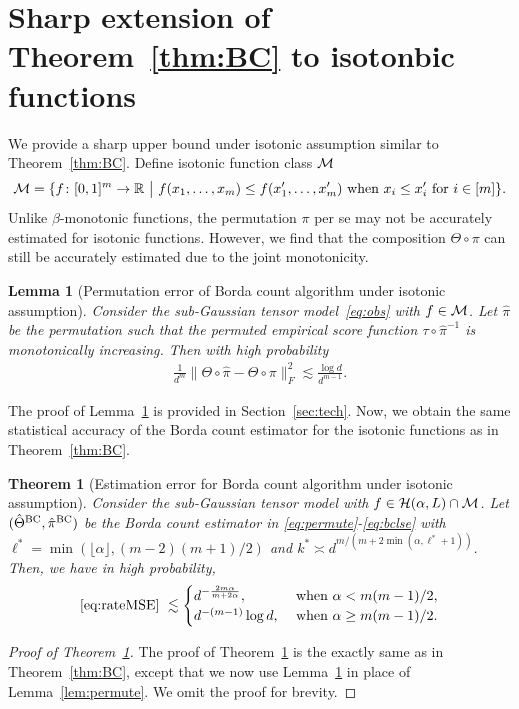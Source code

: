 \documentclass[12pt]{article}
\newtheorem{thm}{Theorem}
\newtheorem{lem}{Lemma}
\theoremstyle{definition}
\begin{document}
 {\color{blue}
\section{Sharp extension of Theorem~\ref{thm:BC} to isotonbic functions}\label{sec:isotonic}
We provide a sharp upper bound under isotonic assumption similar to Theorem~\ref{thm:BC}. Define isotonic function class $\mathcal{M}$ 
\begin{align}
    \tM = \{f\colon[0,1]^m\rightarrow\mathbb{R}\ \big| \ f(x_1,\ldots,x_m)\leq f(x_1',\ldots,x_m')\text{ when } x_i\leq x_i' \text{ for } i\in[m]\}.
\end{align}
Unlike $\beta$-monotonic functions, the permutation $\pi$ per se may not be accurately estimated for isotonic functions. However, we find that the composition $\Theta\circ \pi$ can still be accurately estimated due to the joint monotonicity. 
\begin{lem}[Permutation error of Borda count algorithm under isotonic assumption]\label{lem:isotonic}
Consider the sub-Gaussian tensor model~\eqref{eq:obs} with $f\in\mathcal{M}$. Let $\hat\pi$ be the permutation such that the permuted empirical score function $\tau\circ\hat\pi^{-1}$ is monotonically increasing. Then with high probability
\begin{align}
    \frac{1}{d^m}\|\Theta\circ\hat\pi-\Theta\circ\pi\|_F^2\lesssim \frac{\log d}{d^{m-1}}.
\end{align}
\end{lem}
The proof of Lemma~\ref{lem:isotonic} is provided in Section~\ref{sec:tech}. 
Now, we obtain the same statistical accuracy of the Borda count estimator for the isotonic functions as in Theorem~\ref{thm:BC}. 
\begin{thm}[Estimation error for Borda count algorithm under isotonic assumption]\label{thm:BC2} Consider the sub-Gaussian tensor model with $f\in \mathcal{H}(\alpha,L)\cap \mathcal{M}$.
Let $(\hat\Theta^{\textup{BC}},\hat\pi^{\textup{BC}})$ be the Borda count estimator in \eqref{eq:permute}-\eqref{eq:bclse} with {\small $\ell^* = \min(\lfloor \alpha\rfloor,(m-2)(m+1)/2)$} and $k^*\asymp d^{m/(m+2\min(\alpha,\ell^*+1))}$. Then, we have in high probability,
\begin{align}\label{eq:rates2}
     \eqref{eq:rateMSE}\ \lesssim 
     \begin{cases} 
     d^{-\frac{2m\alpha}{m+2\alpha}}, & \text{ when } \alpha < m(m-1)/2,\\
     d^{-(m-1)}\log d, &\text{ when } \alpha \geq m(m-1)/2.
    \end{cases}
\end{align}
\end{thm}

\begin{proof}[Proof of Theorem~\ref{thm:BC2}]
The proof of Theorem~\ref{thm:BC2} is the exactly same as in Theorem~\ref{thm:BC}, except that we now use Lemma~\ref{lem:isotonic} in place of Lemma~\ref{lem:permute}. We omit the proof for brevity. 
\end{proof}
}
\end{document}
